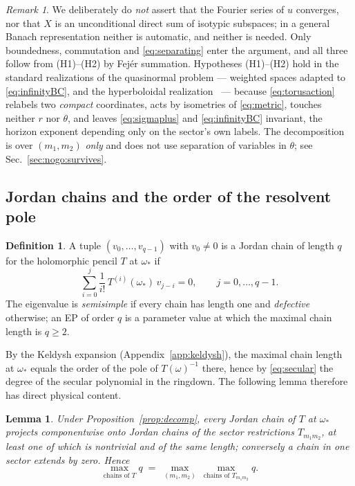 \documentclass[aps,prd,reprint,superscriptaddress,nofootinbib,longbibliography]{revtex4-2}
\theoremstyle{plain}
\newtheorem{lemma}[theorem]{Lemma}
\theoremstyle{definition}
\newtheorem{definition}[theorem]{Definition}
\theoremstyle{remark}
\newtheorem{remark}[theorem]{Remark}
\begin{document}
\begin{remark}\label{rem:whatweuse}
We deliberately do \emph{not} assert that the Fourier series of $u$ converges,
nor that $X$ is an unconditional direct sum of isotypic subspaces; in a general
Banach representation neither is automatic, and neither is needed. Only
boundedness, commutation and \eqref{eq:separating} enter the argument, and all
three follow from (H1)--(H2) by Fej\'er summation. Hypotheses (H1)--(H2) hold in
the standard realizations of the quasinormal problem --- weighted spaces adapted
to \eqref{eq:infinityBC}, and the hyperboloidal
realization~\cite{Jaramillo2020C36} --- because \eqref{eq:torusaction} relabels
two \emph{compact} coordinates, acts by isometries of \eqref{eq:metric}, touches
neither $r$ nor $\theta$, and leaves \eqref{eq:sigmaplus} and
\eqref{eq:infinityBC} invariant, the horizon exponent depending only on the
sector's own labels. The decomposition is over $(m_1,m_2)$ \emph{only} and does
not use separation of variables in $\theta$; see Sec.~\ref{sec:nogo:survives}.
\end{remark}

\subsection{Jordan chains and the order of the resolvent pole}
\label{sec:nogo:jordan}

\begin{definition}
A tuple $(v_0,\dots,v_{q-1})$ with $v_0\ne0$ is a Jordan chain of length $q$ for
the holomorphic pencil $T$ at $\omega_*$ if
\begin{equation}\label{eq:jordanchain}
  \sum_{i=0}^{j}\frac{1}{i!}\,T^{(i)}(\omega_*)\,v_{j-i}=0,
  \qquad j=0,\dots,q-1 .
\end{equation}
The eigenvalue is \emph{semisimple} if every chain has length one and
\emph{defective} otherwise; an EP of order $q$ is a parameter value at which the
maximal chain length is $q\ge2$.
\end{definition}

By the Keldysh expansion (Appendix~\ref{app:keldysh}), the maximal chain length
at $\omega_*$ equals the order of the pole of $T(\omega)^{-1}$ there, hence by
\eqref{eq:secular} the degree of the secular polynomial in the ringdown. The
following lemma therefore has direct physical content.

\begin{lemma}\label{lem:directsum}
Under Proposition~\ref{prop:decomp}, every Jordan chain of $T$ at $\omega_*$
projects componentwise onto Jordan chains of the sector restrictions
$T_{m_1m_2}$, at least one of which is nontrivial and of the same length;
conversely a chain in one sector extends by zero. Hence
\begin{equation}\label{eq:maxchain}
  \max_{\text{chains of }T}q
  \;=\;\max_{(m_1,m_2)}\ \max_{\text{chains of }T_{m_1m_2}}q .
\end{equation}
\end{lemma}
\end{document}
